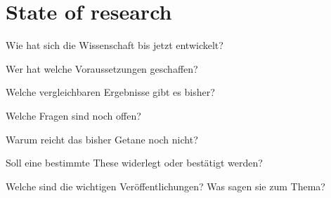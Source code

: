 \chapter{State of research}
\label{chap:state_of_research}

Wie hat sich die Wissenschaft bis jetzt entwickelt?

Wer hat welche Voraussetzungen geschaffen?

Welche vergleichbaren Ergebnisse gibt es bisher?

Welche Fragen sind noch offen?

Warum reicht das bisher Getane noch nicht?

Soll eine bestimmte These widerlegt oder bestätigt werden?

Welche sind die wichtigen Veröffentlichungen? Was sagen sie zum Thema?